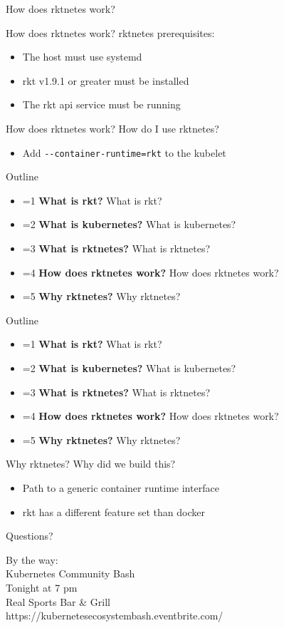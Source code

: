 \documentclass[pdf,aspectratio=169,14pt]{beamer}
\newcommand{\mbold}[3]{
    \ifnum #1=#2
        \textbf{#3}
    \else
        #3
    \fi
}
\newcommand{\outline}[1]{
    \begin{frame}
        Outline
        \begin{itemize}
            \item \mbold{#1}{1}{What is rkt?}
            \item \mbold{#1}{2}{What is kubernetes?}
            \item \mbold{#1}{3}{What is rktnetes?}
            \item \mbold{#1}{4}{How does rktnetes work?}
            \item \mbold{#1}{5}{Why rktnetes?}
        \end{itemize}
    \end{frame}
}
\begin{document}
\begin{frame}{How does rktnetes work?}
\end{frame}

\begin{frame}{How does rktnetes work?}
    rktnetes prerequisites:
    \begin{itemize}
        \item<2-> The host must use systemd
        \item<3-> rkt v1.9.1 or greater must be installed
        \item<4-> The rkt api service must be running
    \end{itemize}
\end{frame}

\begin{frame}{How does rktnetes work?}
    How do I use rktnetes?
    \begin{itemize}
        \item<2-> Add \texttt{-{}-container-runtime=rkt} to the kubelet
    \end{itemize}
\end{frame}


\outline{4}
\outline{5}

\begin{frame}{Why rktnetes?}
    Why did we build this?
    \begin{itemize}
        \item Path to a generic container runtime interface
        \item rkt has a different feature set than docker
    \end{itemize}
\end{frame}

\begin{frame}
    \center \LARGE Questions?
    \normalsize
\end{frame}

\begin{frame}
    By the way: \\
    \vspace{1em}
    \pause
    \LARGE Kubernetes Community Bash \normalsize \\
    Tonight at 7 pm \\
    Real Sports Bar \& Grill \\
    \vspace{1em}
    https://kubernetesecosystembash.eventbrite.com/
\end{frame}
\end{document}
